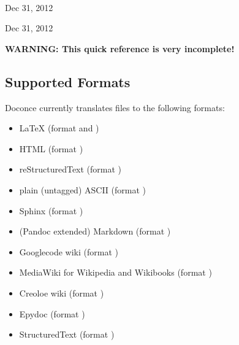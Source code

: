 \documentclass[%
oneside,                 %
final,                   %
chapterprefix=true,      %
open=right               %
10pt]{book}
\begin{document}
\begin{center}


\date{Dec 31, 2012}
\maketitle


\ \\ [10mm]
{\large\textsf{Dec 31, 2012}}

\end{center}
\vfill
\clearpage


\begin{center}
Dec 31, 2012
\end{center}

\vspace{1cm}



\tableofcontents

\vspace{1cm} %






\textbf{WARNING: This quick reference is very incomplete!}

\subsection{Supported Formats}

Doconce currently translates files to the following formats:

\begin{itemize}
 \item {\LaTeX} (format  and )

 \item HTML (format )

 \item reStructuredText (format )

 \item plain (untagged) ASCII (format )

 \item Sphinx (format )

 \item (Pandoc extended) Markdown (format )

 \item Googlecode wiki (format )

 \item MediaWiki for Wikipedia and Wikibooks (format )

 \item Creoloe wiki (format )

 \item Epydoc (format )

 \item StructuredText (format )
\end{itemize}
\end{document}
